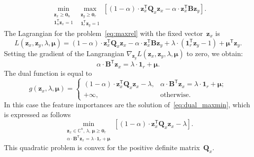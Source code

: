 \documentclass[12pt,oneside]{article}
\theoremstyle{definition}
\newcommand{\bz}{\mathbf{z}}
\newcommand{\bB}{\mathbf{B}}
\newcommand{\bQ}{\mathbf{Q}}
\newcommand{\T}{\mathsf{T}}
\newcommand{\bmu}{\boldsymbol{\mu}}
\newcommand{\bOne}{\boldsymbol{1}}
\newcommand{\bZero}{\boldsymbol{0}}
\begin{document}
\begin{equation}
\min_{\substack{\bz_x \geq \bZero_n \\ \bOne_n^{\T}\bz_x=1}} 	\max_{\substack{\bz_y \geq \bZero_r \\ \bOne_r^{\T}\bz_y=1}} \left[ (1 - \alpha) \cdot \bz_x^{\T} \bQ_x \bz_x - \alpha \cdot \bz_x^{\T} \bB \bz_y \right].
\label{eq:maxrel}
\end{equation}
The Lagrangian for the problem~\eqref{eq:maxrel} with the fixed vector~$\bz_x$ is
\begin{equation}
L(\bz_x, \bz_y, \lambda, \bmu) = (1 - \alpha) \cdot \bz_x^{\T} \bQ_x \bz_x - \alpha \cdot \bz_x^{\T} \bB \bz_y + \lambda \cdot  (\bOne_r^{\T} \bz_y - 1) + \bmu^{\T} \bz_y.
\end{equation}
Setting the gradient of the Langrangian $\nabla_{\bz_y} L(\bz_x, \bz_y, \lambda, \bmu)$ to zero, we obtain:
\begin{equation}
\alpha \cdot \bB^{\T} \bz_x = \lambda \cdot \bOne_r + \bmu.
\end{equation}
The dual function is equal to
\begin{equation}
g(\bz_x, \lambda, \bmu) =
\begin{cases}
(1 - \alpha) \cdot \bz_x^{\T} \bQ_x \bz_x - \lambda, & \alpha \cdot \bB^{\T} \bz_x = \lambda \cdot \bOne_r + \bmu;  \\
+ \infty, & \text{otherwise}.
\end{cases}
\end{equation}
In this case the feature importances are the solution of~\eqref{eq:dual_maxmin}, which is expressed as follows
\begin{equation}
\min_{\substack{\bz_x \in \mathbb{C}^n, \, \lambda, \, \bmu \geq \bZero_r \\ \alpha \cdot \bB^{\T} \bz_x = \lambda \cdot \bOne_r + \bmu}} \left[ (1 - \alpha) \cdot \bz_x^{\T} \bQ_x \bz_x - \lambda \right].
\end{equation}
This quadratic problem is convex for the positive definite matrix~$\bQ_x$.
\end{document}
